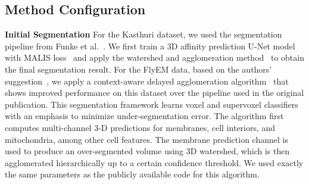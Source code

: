 
\subsection{Method Configuration}
\noindent\textbf{Initial Segmentation}
For the Kasthuri dataset, we used the segmentation pipeline from Funke et al.~\cite{funke2017deep}. 
We first train a 3D affinity prediction U-Net model~\cite{ronneberger2015u} with MALIS loss~\cite{Turaga:2009} and apply the watershed and agglomeration method~\cite{funke2017deep} to obtain the final segmentation result.
For the FlyEM data, based on the authors' suggestion~\cite{takemura2017connectome}, we apply a context-aware delayed agglomeration algorithm~\cite{10.1371/journal.pone.0125825} that shows improved performance on this dataset over the pipeline used in the original publication. 
This segmentation framework learns voxel and supervoxel classifiers with an emphasis to minimize under-segmentation error. 
The algorithm first computes multi-channel 3-D predictions for membranes, cell interiors, and mitochondria, among other cell features. 
The membrane prediction channel is used to produce an over-segmented volume using 3D watershed, which is then agglomerated hierarchically up to a certain confidence threshold. 
We used exactly the same parameters as the publicly available code for this algorithm.

